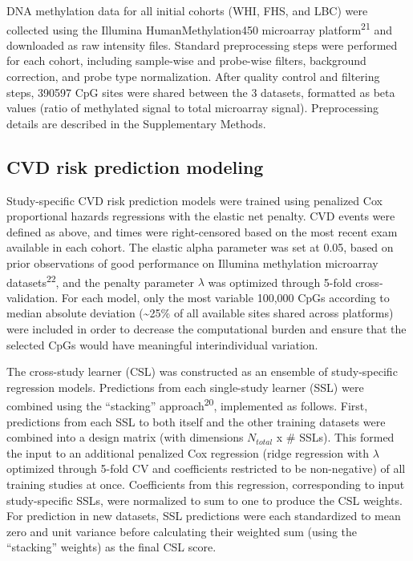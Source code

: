 \documentclass[]{article}
\begin{document}
DNA methylation data for all initial cohorts (WHI, FHS, and LBC) were
collected using the Illumina HumanMethylation450 microarray
platform\textsuperscript{21} and downloaded as raw intensity files.
Standard preprocessing steps were performed for each cohort, including
sample-wise and probe-wise filters, background correction, and probe
type normalization. After quality control and filtering steps, 390597
CpG sites were shared between the 3 datasets, formatted as beta values
(ratio of methylated signal to total microarray signal). Preprocessing
details are described in the Supplementary Methods.

\hypertarget{cvd-risk-prediction-modeling}{%
\subsection{CVD risk prediction
modeling}\label{cvd-risk-prediction-modeling}}

Study-specific CVD risk prediction models were trained using penalized
Cox proportional hazards regressions with the elastic net penalty. CVD
events were defined as above, and times were right-censored based on the
most recent exam available in each cohort. The elastic alpha parameter
was set at 0.05, based on prior observations of good performance on
Illumina methylation microarray datasets\textsuperscript{22}, and the
penalty parameter \(\lambda\) was optimized through 5-fold
cross-validation. For each model, only the most variable 100,000 CpGs
according to median absolute deviation (\textasciitilde{}25\% of all
available sites shared across platforms) were included in order to
decrease the computational burden and ensure that the selected CpGs
would have meaningful interindividual variation.

The cross-study learner (CSL) was constructed as an ensemble of
study-specific regression models. Predictions from each single-study
learner (SSL) were combined using the ``stacking''
approach\textsuperscript{20}, implemented as follows. First, predictions
from each SSL to both itself and the other training datasets were
combined into a design matrix (with dimensions \(N_{total}\) x \# SSLs).
This formed the input to an additional penalized Cox regression (ridge
regression with \(\lambda\) optimized through 5-fold CV and coefficients
restricted to be non-negative) of all training studies at once.
Coefficients from this regression, corresponding to input study-specific
SSLs, were normalized to sum to one to produce the CSL weights. For
prediction in new datasets, SSL predictions were each standardized to
mean zero and unit variance before calculating their weighted sum (using
the ``stacking'' weights) as the final CSL score.
\end{document}
